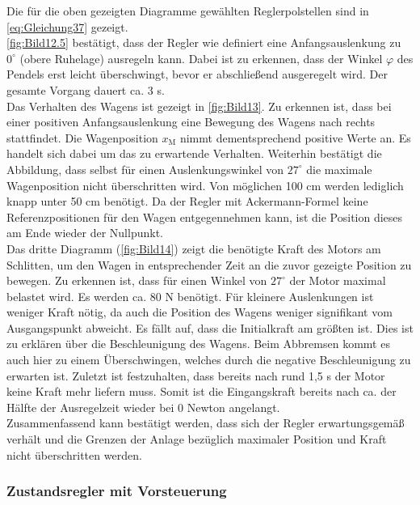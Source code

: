 \documentclass[
	pagesize,
	fontsize=12pt,
	paper=a4,
	oneside,
   reqno
]{scrartcl}
\newcommand{\ca}{ca.\xspace}
\begin{document}
Die für die oben gezeigten Diagramme gewählten Reglerpolstellen sind in \autoref{eq:Gleichung37} gezeigt. \\
\newline
\autoref{fig:Bild12.5} bestätigt, dass der Regler wie definiert eine Anfangsauslenkung zu $0^\circ$ (obere Ruhelage) ausregeln kann. Dabei ist zu erkennen, dass der Winkel $\varphi$ des Pendels erst leicht überschwingt, bevor er abschließend ausgeregelt wird. Der gesamte Vorgang dauert \ca 3 s. \\
\newline
Das Verhalten des Wagens ist gezeigt in \autoref{fig:Bild13}. Zu erkennen ist, dass bei einer positiven Anfangsauslenkung eine Bewegung des Wagens nach rechts stattfindet. Die Wagenposition $x_{\mathrm{M}}$ nimmt dementsprechend positive Werte an. Es handelt sich dabei um das zu erwartende Verhalten. Weiterhin bestätigt die Abbildung, dass selbst für einen Auslenkungswinkel von $27^\circ$ die maximale Wagenposition nicht überschritten wird. Von möglichen 100 cm werden lediglich knapp unter 50 cm benötigt. Da der Regler mit Ackermann-Formel keine Referenzpositionen für den Wagen entgegennehmen kann, ist die Position dieses am Ende wieder der Nullpunkt. \\
\newline
Das dritte Diagramm (\autoref{fig:Bild14}) zeigt die benötigte Kraft des Motors am Schlitten, um den Wagen in entsprechender Zeit an die zuvor gezeigte Position zu bewegen. Zu erkennen ist, dass für einen Winkel von $27^\circ$ der Motor maximal belastet wird. Es werden \ca 80 N benötigt. Für kleinere Auslenkungen ist weniger Kraft nötig, da auch die Position des Wagens weniger signifikant vom Ausgangspunkt abweicht. Es fällt auf, dass die Initialkraft am größten ist. Dies ist zu erklären über die Beschleunigung des Wagens. Beim Abbremsen kommt es auch hier zu einem Überschwingen, welches durch die negative Beschleunigung zu erwarten ist. Zuletzt ist festzuhalten, dass bereits nach rund 1,5 s der Motor keine Kraft mehr liefern muss. Somit ist die Eingangskraft bereits nach \ca der Hälfte der Ausregelzeit wieder  bei 0 Newton angelangt.\\
\newline
Zusammenfassend kann bestätigt werden, dass sich der Regler erwartungsgemäß verhält und die Grenzen der Anlage bezüglich maximaler Position und Kraft nicht überschritten werden.

\subsubsection{Zustandsregler mit Vorsteuerung} \label{sec:val-vor}
\end{document}
